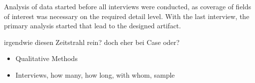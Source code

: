 	Analysis of data started before all interviews were conducted, as coverage of fields of interest was necessary on the required detail level. With the last interview, the primary analysis started that lead to the designed artifact.
	
	
	irgendwie diesen Zeitstrahl rein?  doch eher bei Case oder?
	
	
		\begin{itemize}
			\item Qualitative Methods
			\item Interviews, how many, how long, with whom, sample
			
		\end{itemize}
	
